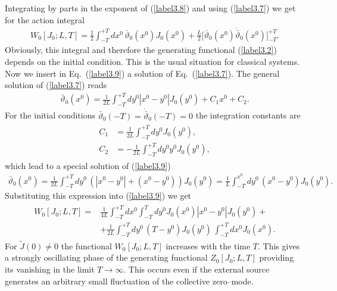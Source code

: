\documentclass[a4paper,12pt] {article}
\begin{document}
Integrating by parts in the exponent of (\ref{label3.8}) and using
(\ref{label3.7}) we get for the action integral
%
\begin{eqnarray}\label{label3.9}
W_0[J_0;L,T] = \frac{1}{2}\int_{-T}^{+T}dx^0\,
\bar{\vartheta}_0(x^0)J_0(x^0)+
\frac{L}{2}\Big[\bar{\vartheta}_0(x^0)
\dot{\bar{\vartheta}}_0(x^0)\Big]_{-T}^{+T}.
\end{eqnarray}
%
Obviously, this integral and therefore the generating functional
(\ref{label3.2}) depends on the initial condition. This is the usual
situation for classical systems. Now we insert in
Eq.~(\ref{label3.9}) a solution of Eq.~(\ref{label3.7}). The general
solution of (\ref{label3.7}) reads
%
\begin{eqnarray}\label{label3.10}
\bar{\vartheta}_0(x^0) = \frac{1}{2L}
\int_{-T}^{+T}dy^0|x^0 - y^0| J_0(y^0) + C_1x^0 + C_2.
\end{eqnarray}
%
For the initial conditions $\bar{\vartheta}_0(-T) =
\dot{\bar{\vartheta}}_0(-T) = 0$ the integration constants are
%
\begin{eqnarray}\label{label3.11}
\begin{aligned}
C_1 &= \frac{1}{2L}\int_{-T}^{+T}dy^0 J_0(y^0),\\
C_2&=-\frac{1}{2L}\int_{-T}^{+T}dy^0 y^0 J_0(y^0),
\end{aligned}
\end{eqnarray}
%
which lead to a special solution of (\ref{label3.9}) 
%
\begin{eqnarray}\label{label3.12}
\bar{\vartheta}_0(x^0)
= \frac{1}{2L} \int_{-T}^{+T}dy^0\,(|x^0 - y^0| + (x^0 - y^0)) J_0(y^0)
= \frac{1}{L} \int_{-T}^{x^0} dy^0\,(x^0 - y^0) J_0(y^0).
\end{eqnarray}
%
Substituting this expression into (\ref{label3.9}) we get
%
\begin{eqnarray}\label{label3.13}
\begin{aligned}
W_0[J_0;L,T]
= &\frac{1}{4L}\int_{-T}^{+T}dx^0\int^{T}_{-T}dy^0
J_0(x^0)|x^0 - y^0|J_0(y^0)+\\
&+\frac{1}{2L}
\int_{-T}^{+T}dy^0\,(T - y^0)J_0(y^0) \,\int_{-T}^{+T}dx^0J_0(x^0).
\end{aligned}
\end{eqnarray}
%
For $\tilde{J}(0) \neq 0$ the functional $W_0[J_0;L,T]$ increases
with the time $T$. This gives a strongly oscillating phase of the
generating functional $Z_0[J_0;L,T]$ providing its vanishing in
the limit $T \to \infty$. This occurs even if the external source
generates an arbitrary small fluctuation of the collective
zero--mode.
\end{document}
